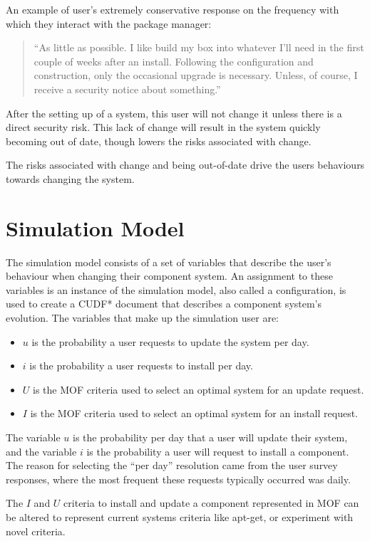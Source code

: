An example of user's extremely conservative response on the frequency with which they interact with the package manager:
\begin{quotation}
``As little as possible. I like build my box into whatever I'll need in the first couple of weeks after an install. 
Following the configuration and construction, only the occasional upgrade is necessary. 
Unless, of course, I receive a security notice about something.''
\end{quotation}
After the setting up of a system, this user will not change it unless there is a direct security risk.
This lack of change will result in the system quickly becoming out of date, though lowers the risks associated with change.

The risks associated with change and being out-of-date drive the users behaviours towards changing the system. 

\section{Simulation Model}
The simulation model consists of a set of variables that describe the user's behaviour when changing their component system.
An assignment to these variables is an instance of the simulation model, also called a configuration, is used to create a CUDF* document that describes a component system's evolution.
The variables that make up the simulation user are: 
\begin{itemize}
  \item $u$ is the probability a user requests to update the system per day.
  \item $i$ is the probability a user requests to install per day.
  \item $U$ is the MOF criteria used to select an optimal system for an update request.
  \item $I$ is the MOF criteria used to select an optimal system for an install request.
\end{itemize}

The variable $u$ is the probability per day that a user will update their system, and the variable $i$ is the probability a user will request to install a component.
The reason for selecting the ``per day'' resolution came from the user survey responses, where the most frequent these requests typically occurred was daily.

The $I$ and $U$ criteria to install and update a component represented in MOF can be altered to represent current systems criteria like apt-get,
or experiment with novel criteria.

